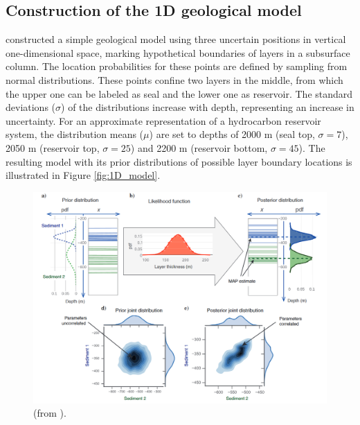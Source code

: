 			\subsection{Construction of the 1D geological model}\label{sec:1D_construction}	
			\citet{delaVarga2016} constructed a simple geological model using three uncertain positions in vertical one-dimensional space, marking hypothetical boundaries of layers in a subsurface column. The location probabilities for these points are defined by sampling from normal distributions. These points confine two layers in the middle, from which the upper one can be labeled as seal and the lower one as reservoir. The standard deviations ($\sigma$) of the distributions increase with depth, representing an increase in uncertainty. For an approximate representation of a hydrocarbon reservoir system, the distribution means ($\mu$) are set to depths of 2000 m (seal top, $\sigma=7$), 2050 m (reservoir top, $\sigma=25$) and 2200 m (reservoir bottom, $\sigma=45$). The resulting model with its prior distributions of possible layer boundary locations is illustrated in Figure \ref{fig:1D_model}.
			\begin{figure}[h]
			\centering
			\includegraphics[width=1\textwidth]{Figures/1D_principle.PNG}
			\caption{ (from \citet{delaVarga2016}).}\label{fig:1D_principle}
			\end{figure}
